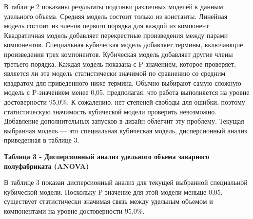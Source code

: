 В таблице 2 показаны результаты подгонки различных моделей к данным
удельного объема. Средняя модель состоит только из константы. Линейная
модель состоит из членов первого порядка для каждой из компонент.
Квадратичная модель добавляет перекрестные произведения между парами
компонентов. Специальная кубическая модель добавляет термины, включающие
произведения трех компонентов. Кубическая модель добавляет другие члены
третьего порядка. Каждая модель показана с P-значением, которое
проверяет, является ли эта модель статистически значимой по сравнению со
средним квадратом для приведенного ниже термина. Обычно выбирают самую
сложную модель с P-значением менее 0,05, предполагая, что работа
выполняется на уровне достоверности 95,0\%. К сожалению, нет степеней
свободы для ошибки, поэтому статистическую значимость кубической модели
проверить невозможно. Добавление дополнительных запусков в дизайн
облегчит эту проблему. Текущая выбранная модель --- это специальная
кубическая модель, дисперсионный анализ приведенная в таблице 3.

{\bfseries Таблица 3 - Дисперсионный анализ удельного объема заварного
полуфабриката (ANOVA)}


В таблице 3 показан дисперсионный анализ для текущей выбранной
специальной кубической модели. Поскольку P-значение для этой модели
меньше 0,05, существует статистически значимая связь между удельным
объемом и компонентами на уровне достоверности 95,0\%.


